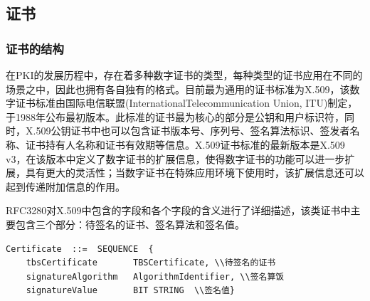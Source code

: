 \subsection{证书}

\subsubsection{证书的结构}


在PKI的发展历程中，存在着多种数字证书的类型，每种类型的证书应用在不同的场景之中，因此也拥有各自独有的格式。目前最为通用的证书标准为X.509，该数字证书标准由国际电信联盟(InternationalTelecommunication Union, ITU)制定，于1988年公布最初版本。此标准的证书最为核心的部分是公钥和用户标识符，同时，X.509公钥证书中也可以包含证书版本号、序列号、签名算法标识、签发者名称、证书持有人名称和证书有效期等信息。X.509证书标准的最新版本是X.509 v3，在该版本中定义了数字证书的扩展信息，使得数字证书的功能可以进一步扩展，具有更大的灵活性；当数字证书在特殊应用环境下使用时，该扩展信息还可以起到传递附加信息的作用。

RFC3280\cite{housley1998internet}对X.509中包含的字段和各个字段的含义进行了详细描述，该类证书中主要包含三个部分：待签名的证书、签名算法和签名值。


\begin{lstlisting}[caption={X.509证书结构}]
Certificate  ::=  SEQUENCE  {
    tbsCertificate       TBSCertificate, \\待签名的证书
    signatureAlgorithm   AlgorithmIdentifier, \\签名算饭
    signatureValue       BIT STRING  \\签名值}

 \end{lstlisting}

